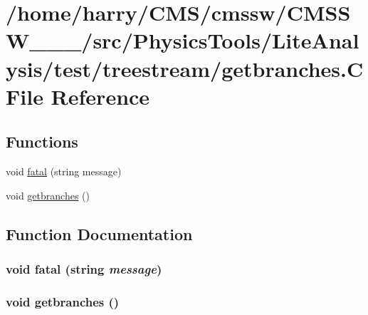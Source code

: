 \hypertarget{getbranches_8C}{
\section{/home/harry/CMS/cmssw/CMSSW\_\_\_/src/Physics\-Tools/Lite\-Analysis/test/treestream/getbranches.C File Reference}
\label{getbranches_8C}
}


\subsection*{Functions}
\begin{CompactItemize}
\item 
void \hyperlink{getbranches_8C_a0}{fatal} (string message)
\item 
void \hyperlink{getbranches_8C_a1}{getbranches} ()
\end{CompactItemize}


\subsection{Function Documentation}
\hypertarget{getbranches_8C_a0}{
\subsubsection[fatal]{\setlength{\rightskip}{0pt plus 5cm}void fatal (string {\em message})}}
\label{getbranches_8C_a0}


\hypertarget{getbranches_8C_a1}{
\subsubsection[getbranches]{\setlength{\rightskip}{0pt plus 5cm}void getbranches ()}}
\label{getbranches_8C_a1}



